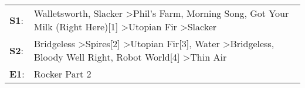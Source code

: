 \begin{supertabular}{p{0.03\textwidth}p{0.92\textwidth}}
 \textbf{S1}:  &                                         Walletsworth\textsuperscript{}, \enspace Slacker\textsuperscript{} \textgreater \enspace Phil's Farm\textsuperscript{}, \enspace Morning Song\textsuperscript{}, \enspace Got Your Milk (Right Here)[1]\textsuperscript{} \textgreater \enspace Utopian Fir\textsuperscript{} \textgreater \enspace Slacker\textsuperscript{}  \enspace  \\
 \textbf{S2}:  &  Bridgeless\textsuperscript{} \textgreater \enspace Spires[2]\textsuperscript{} \textgreater \enspace Utopian Fir[3]\textsuperscript{}, \enspace Water\textsuperscript{} \textgreater \enspace Bridgeless\textsuperscript{}, \enspace Bloody Well Right\textsuperscript{}, \enspace Robot World[4]\textsuperscript{} \textgreater \enspace Thin Air\textsuperscript{}  \enspace  \\
 \textbf{E1}:  &                                                                                                                                                                                                                                                                                                                                       Rocker Part 2\textsuperscript{}  \enspace  \\
\end{supertabular}
